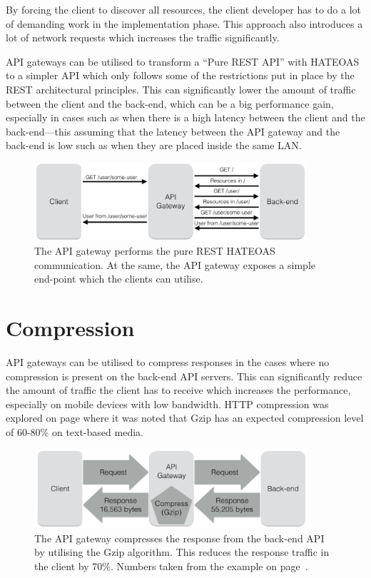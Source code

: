 \documentclass{cslthse-msc}
\begin{document}
By forcing the client to discover all resources, the client developer has to do a lot of demanding work in the implementation phase\cite[page 61]{AASG}. This approach also introduces a lot of network requests which increases the traffic significantly.

API gateways can be utilised to transform a \enquote{Pure REST API} with HATEOAS to a simpler API which only follows some of the restrictions put in place by the REST architectural principles. This can significantly lower the amount of traffic between the client and the back-end, which can be a big performance gain, especially in cases such as when there is a high latency between the client and the back-end---this assuming that the latency between the API gateway and the back-end is low such as when they are placed inside the same LAN.

\begin{figure}[H]
  \centering
    \begin{center}
      \includegraphics[width=0.9\textwidth]{images/api_gateway_hateoas.png}
    \end{center}
  \caption{The API gateway performs the pure REST HATEOAS communication. At the same, the API gateway exposes a simple end-point which the clients can utilise.}
\end{figure}

\section{Compression}
API gateways can be utilised to compress responses in the cases where no compression is present on the back-end API servers. This can significantly reduce the amount of traffic the client has to receive which increases the performance, especially on mobile devices with low bandwidth. HTTP compression was explored on page \pageref{compression} where it was noted that Gzip has an expected compression level of 60-80\% on text-based media.

\begin{figure}[H]
  \centering
    \begin{center}
      \includegraphics[width=0.9\textwidth]{images/api_gateway_compression.png}
    \end{center}
  \caption{The API gateway compresses the response from the back-end API by utilising the Gzip algorithm. This reduces the response traffic in the client by 70\%. Numbers taken from the example on page~\pageref{compression}.}
\end{figure}
\end{document}

